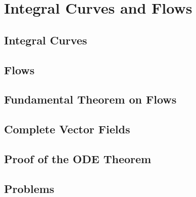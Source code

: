 \chapter{Integral Curves and Flows}
\section{Integral Curves}
\section{Flows}
\section{Fundamental Theorem on Flows}
\section{Complete Vector Fields}
\section{Proof of the ODE Theorem}
\section{Problems}